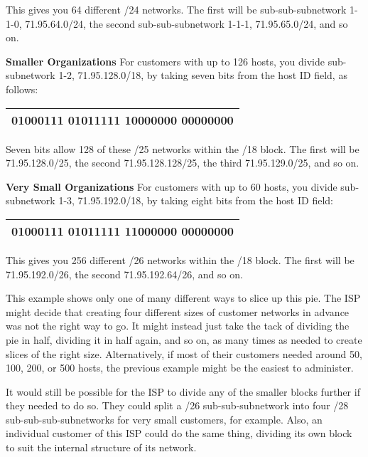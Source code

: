 This gives you 64 different /24 networks. The first will be
sub-sub-subnetwork 1-1-0, 71.95.64.0/24, the second sub-sub-subnetwork
1-1-1, 71.95.65.0/24, and so on.

{\textbf{Smaller Organizations}} For customers with up to 126 hosts, you
divide sub-subnetwork 1-2, 71.95.128.0/18, by taking seven bits from the
host ID field, as follows:

\begin{longtable}[]{@{}l@{}}
\toprule
\endhead
01000111 0101111{\textbf{1}} {\textbf{{10}}}{{000000
0}}0000000\tabularnewline
\bottomrule
\end{longtable}

Seven bits allow 128 of these /25 networks within the /18 block. The
first will be 71.95.128.0/25, the second 71.95.128.128/25, the third
71.95.129.0/25, and so on.

{\textbf{Very Small Organizations}} For customers with up to 60 hosts,
you divide sub-subnetwork 1-3, 71.95.192.0/18, by taking eight bits from
the host ID field:

\begin{longtable}[]{@{}l@{}}
\toprule
\endhead
01000111 0101111{\textbf{1 {11}}}{{000000}} {{00}}000000\tabularnewline
\bottomrule
\end{longtable}

This gives you 256 different /26 networks within the /18 block. The
first will be 71.95.192.0/26, the second 71.95.192.64/26, and so on.

This example shows only one of many different ways to slice up this pie.
The ISP might decide that creating four different sizes of customer
networks in advance was not the right way to go. It might instead just
take the tack of dividing the pie in half, dividing it in half again,
and so on, as many times as needed to create slices of the right size.
Alternatively, if most of their customers needed around 50, 100, 200, or
500 hosts, the previous example might be the easiest to administer.

It would still be possible for the ISP to divide any of the smaller
blocks further if they needed to do so. They could split a /26
sub-sub-subnetwork into four /28 sub-sub-sub-subnetworks for very small
customers, for example. Also, an individual customer of this ISP could
do the same thing, dividing its own block to suit the internal structure
of its network.


